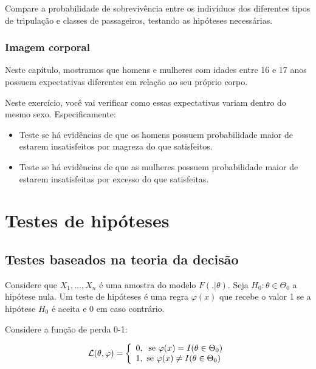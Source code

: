 \documentclass[
  letterpaper,
  DIV=11,
  numbers=noendperiod]{scrreprt}
\theoremstyle{definition}
\theoremstyle{definition}
\theoremstyle{plain}
\theoremstyle{remark}
\begin{document}
Compare a probabilidade de sobrevivência entre os indivíduos dos
diferentes tipos de tripulação e classes de passageiros, testando as
hipóteses necessárias.

\subsection{Imagem corporal}\label{imagem-corporal}

Neste capítulo, mostramos que homens e mulheres com idades entre 16 e 17
anos possuem expectativas diferentes em relação ao seu próprio corpo.

Neste exercício, você vai verificar como essas expectativas variam
dentro do mesmo sexo. Especificamente:

\begin{itemize}
\item
  Teste se há evidências de que os homens possuem probabilidade maior de
  estarem insatisfeitos por magreza do que satisfeitos.
\item
  Teste se há evidências de que as mulheres possuem probabilidade maior
  de estarem insatisfeitas por excesso do que satisfeitas.
\end{itemize}


\chapter{Testes de hipóteses}\label{testes-de-hipuxf3teses}

\section{Testes baseados na teoria da
decisão}\label{testes-baseados-na-teoria-da-decisuxe3o}

Considere que \(X_1,\ldots,X_n\) é uma amostra do modelo
\(F(.|\theta)\). Seja \(H_0:\theta\in\Theta_0\) a hipótese nula. Um
teste de hipóteses é uma regra \(\varphi(x)\) que recebe o valor 1 se a
hipótese \(H_0\) é aceita e 0 em caso contrário.

Considere a função de perda 0-1:

\[ \mathcal{L}(\theta,\varphi)=\left\{\begin{array}{l}0,\;\;\hbox{se }\varphi(x)=I(\theta\in\Theta_0)\\1,\hbox{  se }\varphi(x)\neq I(\theta\in\Theta_0)\end{array}\right.\]
\end{document}
